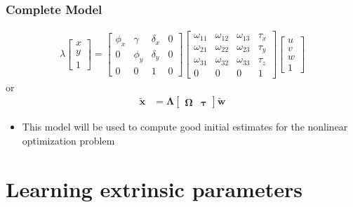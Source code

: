 \documentclass{beamer}
\begin{document}
\begin{frame}
  \frametitle{Complete Model}
    \begin{align*}
      \lambda \begin{bmatrix}
        x \\ y \\ 1
      \end{bmatrix} =
      \begin{bmatrix}
        \phi_x & \gamma & \delta_x & 0 \\
        0 & \phi_y & \delta_y & 0 \\
        0 & 0 & 1 & 0
      \end{bmatrix}
      \begin{bmatrix}
        \omega_{11} & \omega_{12} & \omega_{13} & \tau_x \\
        \omega_{21} & \omega_{22} & \omega_{23} & \tau_y \\
        \omega_{31} & \omega_{32} & \omega_{33} & \tau_z \\
        0 & 0 & 0 & 1
      \end{bmatrix} \begin{bmatrix}
        u \\ v \\ w \\ 1
      \end{bmatrix}
      \end{align*}
      \pause
      or
      \begin{align*}
        \mathbf{\tilde{x}} &= \boldsymbol{\Lambda}
        \begin{bmatrix}
          \boldsymbol{\Omega} &
          \bm{\tau}
        \end{bmatrix}
          \mathbf{\tilde{w}}
      \end{align*}
      \pause
      \begin{itemize}
        \item This model will be used to compute good initial estimates
          for the nonlinear optimization problem
      \end{itemize}
\end{frame}

\section{Learning extrinsic parameters}
\end{document}
